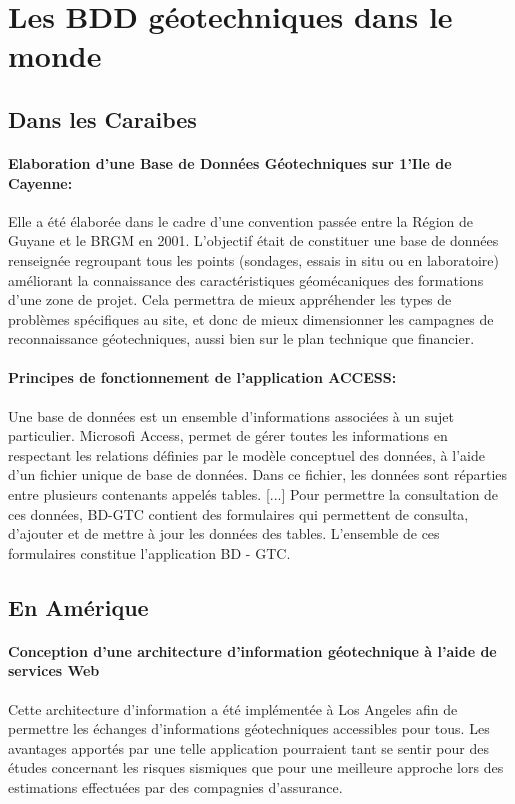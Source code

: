         \section{Les BDD géotechniques dans le monde}
        \subsection{Dans les Caraibes}
        \paragraph{Elaboration d'une Base de Données Géotechniques
        sur 1'Ile de Cayenne: }
        Elle a été élaborée dans le cadre d'une convention passée entre la
        Région de Guyane et le BRGM en 2001.
        \cite{Cayenne}
         L'objectif était de constituer une base de données renseignée regroupant tous les points (sondages, essais
        in situ ou en laboratoire) améliorant la connaissance des caractéristiques géomécaniques des
        formations d'une zone de projet. Cela permettra de mieux appréhender les types de problèmes
        spécifiques au site, et donc de mieux dimensionner les campagnes de reconnaissance
        géotechniques, aussi bien sur le plan technique que financier.
       \paragraph{ Principes de fonctionnement de l'application ACCESS: }
       Une base de données est un ensemble d'informations associées à un sujet particulier.
        Microsofi Access, permet de gérer toutes les informations en respectant les relations définies
        par le modèle conceptuel des données, à l'aide d'un fichier unique de base de données. Dans
        ce fichier, les données sont réparties entre plusieurs contenants appelés tables. [...]
        Pour permettre la consultation de ces données, BD-GTC contient des formulaires qui
        permettent de consulta, d'ajouter et de mettre à jour les données des tables. L'ensemble de ces
        formulaires constitue l'application BD - GTC.
        \cite{Cayenne}

        \subsection{En Amérique}
        \paragraph{Conception d'une architecture d'information géotechnique à l'aide de services Web}
        Cette architecture d'information a été implémentée à Los Angeles afin de permettre les échanges 
        d'informations géotechniques accessibles pour tous. Les avantages apportés par une telle 
        application pourraient tant se sentir pour des études concernant les risques sismiques que pour 
        une meilleure approche lors des estimations effectuées par des compagnies d'assurance. 
        \cite{zimmermann2003design}
